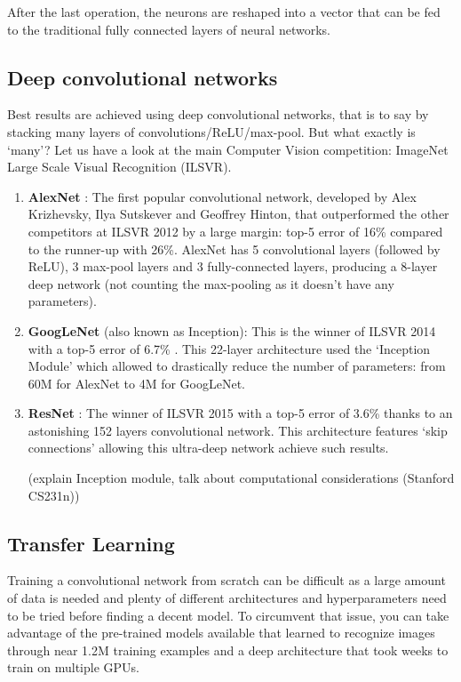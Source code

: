After the last operation, the neurons are reshaped into a vector that can be fed to the traditional fully connected layers of neural networks.

\subsection{Deep convolutional networks}
Best results are achieved using deep convolutional networks, that is to say by stacking many layers of convolutions/ReLU/max-pool. But what exactly is `many'? Let us have a look at the main Computer Vision competition: ImageNet Large Scale Visual Recognition (ILSVR).
\begin{enumerate}
\item \textbf{AlexNet} \cite{alexnet}: The first popular convolutional network, developed by Alex Krizhevsky, Ilya Sutskever and Geoffrey Hinton, that outperformed the other competitors at ILSVR 2012 by a large margin: top-5 error of 16\% compared to the runner-up with 26\%. AlexNet has 5 convolutional layers (followed by ReLU), 3 max-pool layers and 3 fully-connected layers, producing a 8-layer deep network (not counting the max-pooling as it doesn't have any parameters).
\item \textbf{GoogLeNet} (also known as Inception)\cite{googlenet}: This is the winner of ILSVR 2014 with a top-5 error of 6.7\% . This 22-layer architecture used the `Inception Module' which allowed to drastically reduce the number of parameters: from 60M for AlexNet to 4M for GoogLeNet.
\item \textbf{ResNet} \cite{resnet}: The winner of ILSVR 2015 with a top-5 error of 3.6\% thanks to an astonishing 152 layers convolutional network. This architecture features `skip connections' allowing this ultra-deep network achieve such results.

(explain Inception module, talk about computational considerations (Stanford CS231n))
\end{enumerate}

\subsection{Transfer Learning}
Training a convolutional network from scratch can be difficult as a large amount of data is needed and plenty of different architectures and hyperparameters need to be tried before finding a decent model. To circumvent that issue, you can take advantage of the pre-trained models available that learned to recognize images through near 1.2M training examples and a deep architecture that took weeks to train on multiple GPUs.

